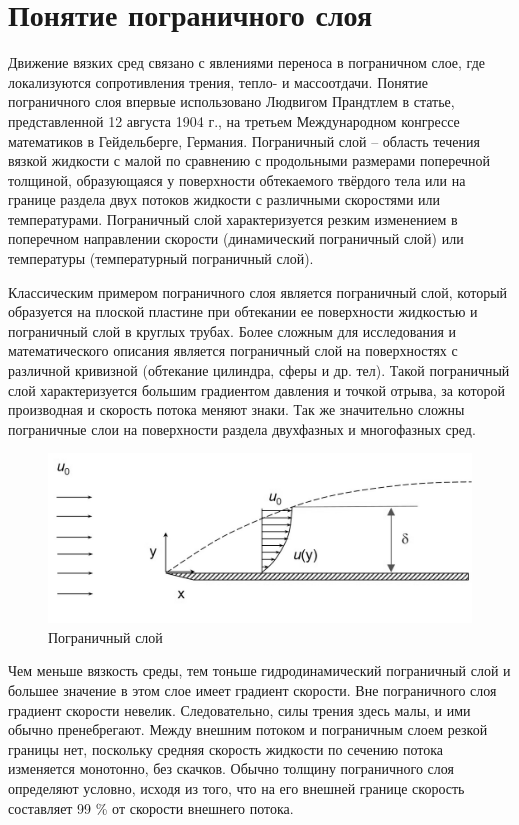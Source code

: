 \section{Понятие пограничного слоя}
	Движение вязких сред связано с явлениями переноса в пограничном слое, где локализуются сопротивления трения, тепло- и массоотдачи. Понятие пограничного слоя впервые использовано Людвигом Прандтлем в статье, представленной 12 августа 1904 г., на третьем Международном конгрессе математиков в Гейдельберге, Германия. Пограничный слой -- область течения вязкой жидкости с малой по сравнению с продольными размерами поперечной толщиной, образующаяся у поверхности обтекаемого твёрдого тела или на границе раздела двух потоков жидкости с различными скоростями или температурами. Пограничный слой характеризуется резким изменением в поперечном направлении скорости (динамический пограничный слой) или температуры (температурный пограничный слой).
	
	Классическим примером пограничного слоя является пограничный слой, который образуется на плоской пластине при обтекании ее поверхности жидкостью и пограничный слой в круглых трубах. Более сложным для исследования и математического описания является пограничный слой на поверхностях с различной кривизной (обтекание цилиндра, сферы и др. тел). Такой пограничный слой характеризуется большим градиентом давления и точкой отрыва, за которой производная и скорость потока меняют знаки. Так же значительно сложны пограничные слои на поверхности раздела двухфазных и многофазных сред.
	\begin{figure}[H]
		\centering
		\includegraphics[width=0.6\linewidth]{../Assets/screenshot001}
		\caption{Пограничный слой}
		\label{fig:screenshot001}
	\end{figure}
	Чем меньше вязкость среды, тем тоньше гидродинамический пограничный слой и большее значение в этом слое имеет градиент скорости. Вне пограничного слоя градиент скорости невелик. Следовательно, силы трения здесь малы, и ими обычно пренебрегают. Между внешним потоком и пограничным слоем резкой границы нет, поскольку средняя скорость жидкости по сечению потока изменяется монотонно, без скачков. Обычно толщину пограничного слоя определяют условно, исходя из того, что на его внешней границе скорость составляет 99 \% от скорости внешнего потока.
	
